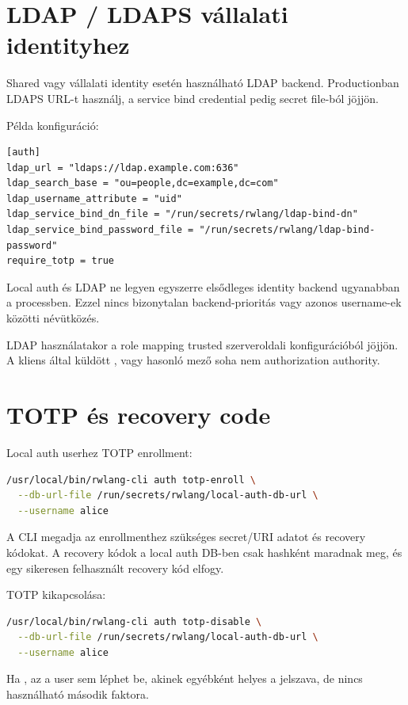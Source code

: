 \section{LDAP / LDAPS vállalati identityhez}

Shared vagy vállalati identity esetén használható LDAP backend. Productionban LDAPS URL-t használj, a service bind credential pedig secret file-ból jöjjön.

Példa konfiguráció:

\begin{lstlisting}
[auth]
ldap_url = "ldaps://ldap.example.com:636"
ldap_search_base = "ou=people,dc=example,dc=com"
ldap_username_attribute = "uid"
ldap_service_bind_dn_file = "/run/secrets/rwlang/ldap-bind-dn"
ldap_service_bind_password_file = "/run/secrets/rwlang/ldap-bind-password"
require_totp = true
\end{lstlisting}

Local auth és LDAP ne legyen egyszerre elsődleges identity backend ugyanabban a processben. Ezzel nincs bizonytalan backend-prioritás vagy azonos username-ek közötti névütközés.

LDAP használatakor a role mapping trusted szerveroldali konfigurációból jöjjön. A kliens által küldött ,  vagy hasonló mező soha nem authorization authority.

\section{TOTP és recovery code}

Local auth userhez TOTP enrollment:

\begin{lstlisting}[language=bash]
/usr/local/bin/rwlang-cli auth totp-enroll \
  --db-url-file /run/secrets/rwlang/local-auth-db-url \
  --username alice
\end{lstlisting}

A CLI megadja az enrollmenthez szükséges secret/URI adatot és recovery kódokat. A recovery kódok a local auth DB-ben csak hashként maradnak meg, és egy sikeresen felhasznált recovery kód elfogy.

TOTP kikapcsolása:

\begin{lstlisting}[language=bash]
/usr/local/bin/rwlang-cli auth totp-disable \
  --db-url-file /run/secrets/rwlang/local-auth-db-url \
  --username alice
\end{lstlisting}

Ha \code{require_totp = true}, az a user sem léphet be, akinek egyébként helyes a jelszava, de nincs használható második faktora.

